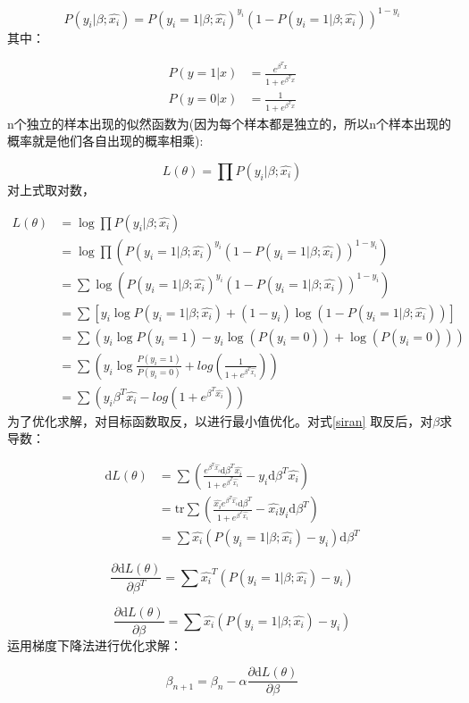 \begin{equation*}
P(y_i|\beta;\hat{x_i})=P(y_i=1|\beta;\hat{x_i})^{y_i}\left(1-P(y_i=1|\beta;\hat{x_i})\right)^{1-y_i}
\end{equation*}
其中：

\begin{align}
P(y=1|x)&=\frac{e^{\beta^Tx}}{1+e^{\beta^Tx}}\\
P(y=0|x)&=\frac{1}{1+e^{\beta^Tx}}
\end{align}
n个独立的样本出现的似然函数为(因为每个样本都是独立的，所以n个样本出现的概率就是他们各自出现的概率相乘):

\begin{equation}
L(\theta)=\prod	P(y_i|\beta;\hat{x_i})
\end{equation}
对上式取对数，

\begin{equation}\label{siran}
\begin{split}
L(\theta)&=\log\prod	P(y_i|\beta;\hat{x_i})\\
&=\log \prod \left(P(y_i=1|\beta;\hat{x_i})^{y_i}\left(1-P(y_i=1|\beta;\hat{x_i})\right)^{1-y_i} \right)\\
&=\sum\log \left(P(y_i=1|\beta;\hat{x_i})^{y_i}\left(1-P(y_i=1|\beta;\hat{x_i})\right)^{1-y_i} \right)\\
&=\sum \left[ y_i\log P(y_i=1|\beta;\hat{x_i}) + (1-y_i)\log(1-P(y_i=1|\beta;\hat{x_i}))\right]\\
&=\sum \left( y_i \log P(y_i=1) - y_i \log(P(y_i=0))+\log(P(y_i=0))\right)\\
&=\sum \left( y_i \log \frac{P(y_i=1)}{P(y_i=0)} + log(\frac{1}{1+e^{\beta^T\hat{x_i}}})\right)\\
&=\sum \left(
y_i\beta^T\hat{x_i}-log(1+e^{\beta^T\hat{x_i}})
\right)
\end{split}
\end{equation}
为了优化求解，对目标函数取反，以进行最小值优化。对式\eqref{siran}	取反后，对$\beta$求导数：

\begin{equation}\label{key}
\begin{split}
\mathrm{d}L(\theta)
&=\sum \left(
\frac{e^{\beta^T\hat{x_i}} \mathrm{d}\beta^T\hat{x_i}}{1+e^{\beta^T\hat{x_i}} }
- y_i \mathrm{d} \beta^T \hat{x_i}
\right)\\
&=\mathrm{tr}\sum \left(
\frac{\hat{x_i}e^{\beta^T\hat{x_i}} \mathrm{d}\beta^T}{1+e^{\beta^T\hat{x_i}} }
- \hat{x_i}y_i \mathrm{d} \beta^T
\right)\\
&=\sum \hat{x_i}(P(y_i=1|\beta;\hat{x_i})-y_i)\mathrm{d}\beta^T
\end{split}
\end{equation}

\begin{equation*}
\frac{\partial \mathrm{d}L(\theta)}{\partial \beta^T}=\sum \hat{x_i}^T(P(y_i=1|\beta;\hat{x_i})-y_i)
\end{equation*}

\begin{equation}
\frac{\partial \mathrm{d}L(\theta)}{\partial \beta}=\sum \hat{x_i}(P(y_i=1|\beta;\hat{x_i})-y_i)
\end{equation}
运用梯度下降法进行优化求解：

\[
\beta_{n+1}=\beta_{n}-\alpha\frac{\partial \mathrm{d}L(\theta)}{\partial \beta}
\]
